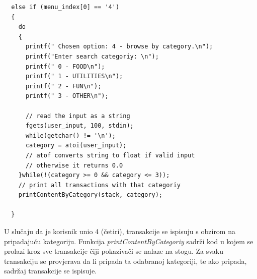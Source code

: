 \documentclass[12pt, letterpaper]{article}
\begin{document}
  \begin{verbatim}
  else if (menu_index[0] == '4')
  {
    do
    {
      printf(" Chosen option: 4 - browse by category.\n");
      printf("Enter search categoriy: \n");
      printf(" 0 - FOOD\n");
      printf(" 1 - UTILITIES\n");
      printf(" 2 - FUN\n");
      printf(" 3 - OTHER\n");
      
      // read the input as a string
      fgets(user_input, 100, stdin);
      while(getchar() != '\n');
      category = atoi(user_input);
      // atof converts string to float if valid input
      // otherwise it returns 0.0
    }while(!(category >= 0 && category <= 3));
    // print all transactions with that categoriy
    printContentByCategory(stack, category);

  }
  \end{verbatim}
  U slučaju da je korisnik unio 4 (četiri), transakcije se ispisuju s obzirom na pripadajuću kategoriju. Funkcija \textit{printContentByCategoriy} sadrži kod u kojem se prolazi kroz sve transakcije čiji pokazivači se nalaze na stogu. Za svaku transakciju se provjerava da li pripada ta odabranoj kategoriji, te ako pripada, sadržaj transakcije se ispisuje.
  
\end{document}
